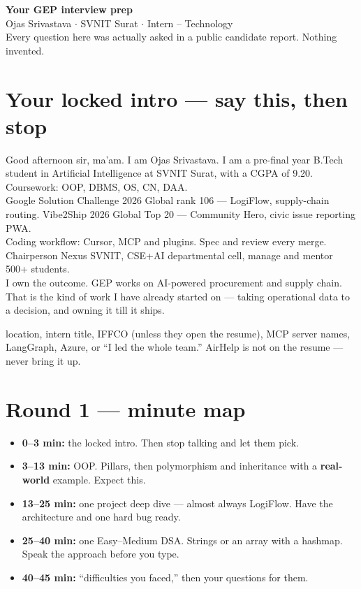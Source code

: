\documentclass[11pt,a4paper]{article}
\newcommand{\card}[1]{%
  \par\vspace{3pt}%
  \noindent\colorbox{soft}{%
    \parbox{\dimexpr\textwidth-2\fboxsep}{\vspace{5pt}#1\vspace{5pt}}%
  }\par\vspace{4pt}%
}
\begin{document}
\begin{center}
  {\LARGE\bfseries\color{accent}Your GEP interview prep}\\[5pt]
  {\color{muted}Ojas Srivastava $\cdot$ SVNIT Surat $\cdot$ Intern -- Technology}\\[3pt]
  {\footnotesize\color{muted}Every question here was actually asked in a public candidate report. Nothing invented.}
\end{center}

\section{Your locked intro --- say this, then stop}
\card{
Good afternoon sir, ma'am. I am Ojas Srivastava. I am a pre-final year B.Tech student in Artificial Intelligence at SVNIT Surat, with a CGPA of 9.20.\\[4pt]
Coursework: OOP, DBMS, OS, CN, DAA.\\[4pt]
Google Solution Challenge 2026 Global rank 106 --- LogiFlow, supply-chain routing. Vibe2Ship 2026 Global Top 20 --- Community Hero, civic issue reporting PWA.\\[4pt]
Coding workflow: Cursor, MCP and plugins. Spec and review every merge.\\[4pt]
Chairperson Nexus SVNIT, CSE+AI departmental cell, manage and mentor 500+ students.\\[4pt]
I own the outcome. GEP works on AI-powered procurement and supply chain. That is the kind of work I have already started on --- taking operational data to a decision, and owning it till it ships.
}

 {\small location, intern title, IFFCO (unless they open the resume), MCP server names, LangGraph, Azure, or ``I led the whole team.'' AirHelp is not on the resume --- never bring it up.}

\section{Round 1 --- minute map}
\begin{itemize}
  \item \textbf{0--3 min:} the locked intro. Then stop talking and let them pick.
  \item \textbf{3--13 min:} OOP. Pillars, then polymorphism and inheritance with a \textbf{real-world} example. Expect this.
  \item \textbf{13--25 min:} one project deep dive --- almost always LogiFlow. Have the architecture and one hard bug ready.
  \item \textbf{25--40 min:} one Easy--Medium DSA. Strings or an array with a hashmap. Speak the approach before you type.
  \item \textbf{40--45 min:} ``difficulties you faced,'' then your questions for them.
\end{itemize}
\end{document}
